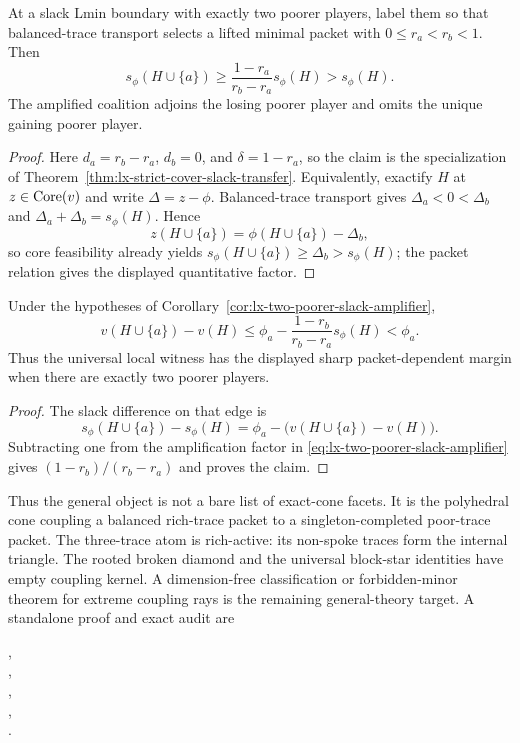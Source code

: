 \begin{corollary}
\label{cor:lx-two-poorer-slack-amplifier}
At a slack Lmin boundary with exactly two poorer players, label them so that
balanced-trace transport selects a lifted minimal packet with
$0\leq r_a<r_b<1$. Then
\[
 s_\phi(H\cup\{a\})
 \geq\frac{1-r_a}{r_b-r_a}s_\phi(H)>s_\phi(H).       \tag{2P}
 \label{eq:lx-two-poorer-slack-amplifier}
\]
The amplified coalition adjoins the losing poorer player and omits the
unique gaining poorer player.
\end{corollary}

\begin{proof}
Here $d_a=r_b-r_a$, $d_b=0$, and $\delta=1-r_a$, so the claim is the
specialization of
Theorem~\ref{thm:lx-strict-cover-slack-transfer}. Equivalently, exactify
$H$ at $z\in\operatorname{Core}(v)$ and write $\Delta=z-\phi$. Balanced-trace transport
gives $\Delta_a<0<\Delta_b$ and
$\Delta_a+\Delta_b=s_\phi(H)$. Hence
\[
 z(H\cup\{a\})=\phi(H\cup\{a\})-\Delta_b,
\]
so core feasibility already yields
$s_\phi(H\cup\{a\})\geq\Delta_b>s_\phi(H)$; the packet relation gives the
displayed quantitative factor.
\end{proof}

\begin{corollary}
\label{cor:lx-two-poorer-marginal-deficit}
Under the hypotheses of
Corollary~\ref{cor:lx-two-poorer-slack-amplifier},
\[
 v(H\cup\{a\})-v(H)
 \leq \phi_a-\frac{1-r_b}{r_b-r_a}s_\phi(H)<\phi_a. \tag{MD}
 \label{eq:lx-two-poorer-marginal-deficit}
\]
Thus the universal local witness has the displayed sharp packet-dependent
margin when there are exactly two poorer players.
\end{corollary}

\begin{proof}
The slack difference on that edge is
\[
 s_\phi(H\cup\{a\})-s_\phi(H)
 =\phi_a-\bigl(v(H\cup\{a\})-v(H)\bigr).
\]
Subtracting one from the amplification factor in
\eqref{eq:lx-two-poorer-slack-amplifier} gives
$(1-r_b)/(r_b-r_a)$ and proves the claim.
\end{proof}

Thus the general object is not a bare list of exact-cone facets.  It is the
polyhedral cone coupling a balanced rich-trace packet to a
singleton-completed poor-trace packet.  The three-trace atom is rich-active:
its non-spoke traces form the internal triangle.  The rooted broken diamond
and the universal block-star identities have empty coupling kernel.  A
dimension-free classification or forbidden-minor theorem for extreme
coupling rays is the remaining general-theory target.  A standalone proof
and exact audit are
\begin{center}
\small{},\\[-2pt]
\small{},\\[-2pt]
\small{},\\[-2pt]
\small{},\\[-2pt]
\small{}.
\end{center}

